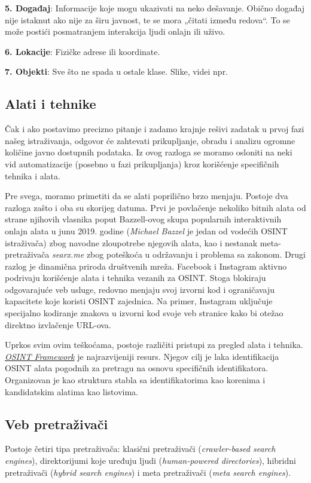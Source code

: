 \documentclass[fleqn, 12pt]{article}
\begin{document}
{\bf 5. Događaj}: Informacije koje mogu ukazivati na neko dešavanje. Obično događaj nije istaknut ako nije za širu javnost, te se mora „čitati između redova“. To se može postići posmatranjem interakcija ljudi onlajn ili uživo.\newline

{\bf 6. Lokacije}: Fizičke adrese ili koordinate.\newline

{\bf 7. Objekti}: Sve što ne spada u ostale klase. Slike, videi npr.
\subsection{Alati i tehnike}
Čak i ako postavimo precizno pitanje i zadamo krajnje rešivi zadatak u prvoj fazi našeg istraživanja, odgovor će zahtevati prikupljanje, obradu i analizu ogromne količine javno dostupnih podataka. Iz ovog razloga se moramo osloniti na neki vid automatizacije (posebno u fazi prikupljanja) kroz korišćenje specifičnih tehnika i alata.\newline

Pre svega, moramo primetiti da se alati poprilično brzo menjaju. Postoje dva razloga zašto i oba su skorijeg datuma. Prvi je povlačenje nekoliko bitnih alata od strane njihovih vlasnika poput Bazzell-ovog skupa popularnih interaktivnih onlajn alata u junu 2019. godine (\textit{Michael Bazzel} je jedan od vodećih OSINT istraživača) zbog navodne zloupotrebe njegovih alata, kao i nestanak meta-pretraživača \textit{searx.me} zbog poteškoća u održavanju i problema sa zakonom. Drugi razlog je dinamična priroda društvenih mreža. Facebook i Instagram aktivno podrivaju korišćenje alata i tehnika vezanih za OSINT. Stoga blokiraju odgovarajuće veb usluge, redovno menjaju svoj izvorni kod i ograničavaju kapacitete koje koristi OSINT zajednica. Na primer, Instagram uključuje specijalno kodiranje znakova u izvorni kod svoje veb stranice kako bi otežao direktno izvlačenje URL-ova.\newline

Uprkos svim ovim teškoćama, postoje različiti pristupi za pregled alata i tehnika. \textit{\href{https://osintframework.com/}{OSINT Framework}} je najrazvijeniji resurs. Njegov cilj je laka identifikacija OSINT alata pogodnih za pretragu na osnovu specifičnih identifikatora. Organizovan je kao struktura stabla sa identifikatorima kao korenima i kandidatskim alatima kao listovima.
\subsection{Veb pretraživači}
Postoje četiri tipa pretraživača: klasični pretraživači (\textit{crawler-based search engines}), direktorijumi koje uređuju ljudi (\textit{human-powered directories}), hibridni pretraživači (\textit{hybrid search engines}) i meta pretraživači (\textit{meta search engines}).\newline
\end{document}
